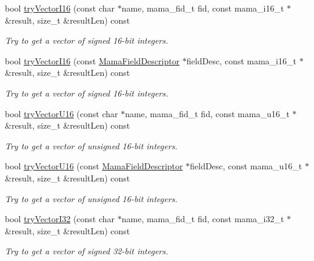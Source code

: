 \begin{DoxyCompactItemize}
bool \hyperlink{classWombat_1_1MamaMsg_ad8fb5bfba631224ee9eeed62250b6032}{tryVectorI16} (const char $\ast$name, mama\_\-fid\_\-t fid, const mama\_\-i16\_\-t $\ast$\&result, size\_\-t \&resultLen) const 
\begin{DoxyCompactList}\small\item\em Try to get a vector of signed 16-\/bit integers. \item\end{DoxyCompactList}\item 
bool \hyperlink{classWombat_1_1MamaMsg_a974f0d598b661287e29282a1c21ee804}{tryVectorI16} (const \hyperlink{classWombat_1_1MamaFieldDescriptor}{MamaFieldDescriptor} $\ast$fieldDesc, const mama\_\-i16\_\-t $\ast$\&result, size\_\-t \&resultLen) const 
\begin{DoxyCompactList}\small\item\em Try to get a vector of signed 16-\/bit integers. \item\end{DoxyCompactList}\item 
bool \hyperlink{classWombat_1_1MamaMsg_a5d20d3dd7e4b9ec2468b7a145765330f}{tryVectorU16} (const char $\ast$name, mama\_\-fid\_\-t fid, const mama\_\-u16\_\-t $\ast$\&result, size\_\-t \&resultLen) const 
\begin{DoxyCompactList}\small\item\em Try to get a vector of unsigned 16-\/bit integers. \item\end{DoxyCompactList}\item 
bool \hyperlink{classWombat_1_1MamaMsg_a79bbe7b1596260718af5c08542b85143}{tryVectorU16} (const \hyperlink{classWombat_1_1MamaFieldDescriptor}{MamaFieldDescriptor} $\ast$fieldDesc, const mama\_\-u16\_\-t $\ast$\&result, size\_\-t \&resultLen) const 
\begin{DoxyCompactList}\small\item\em Try to get a vector of unsigned 16-\/bit integers. \item\end{DoxyCompactList}\item 
bool \hyperlink{classWombat_1_1MamaMsg_acd38982a9a653073418887744e770e1f}{tryVectorI32} (const char $\ast$name, mama\_\-fid\_\-t fid, const mama\_\-i32\_\-t $\ast$\&result, size\_\-t \&resultLen) const 
\begin{DoxyCompactList}\small\item\em Try to get a vector of signed 32-\/bit integers. \item\end{DoxyCompactList}\item 

\end{DoxyCompactItemize}
